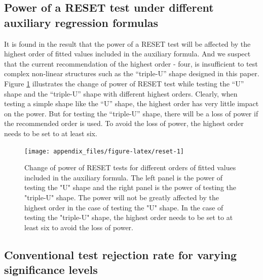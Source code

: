 \documentclass[]{interact}
\theoremstyle{plain}%
\theoremstyle{definition}
\theoremstyle{remark}
\begin{document}
\hypertarget{power-of-a-reset-test-under-different-auxiliary-regression-formulas}{%
\subsection{Power of a RESET test under different auxiliary regression
formulas}\label{power-of-a-reset-test-under-different-auxiliary-regression-formulas}}

It is found in the result that the power of a RESET test will be
affected by the highest order of fitted values included in the auxiliary
formula. And we suspect that the current recommendation of the highest
order - four, is insufficient to test complex non-linear structures such
as the ``triple-U'' shape designed in this paper. Figure \ref{fig:reset}
illustrates the change of power of RESET test while testing the ``U''
shape and the ``triple-U'' shape with different highest orders. Clearly,
when testing a simple shape like the ``U'' shape, the highest order has
very little impact on the power. But for testing the ``triple-U'' shape,
there will be a loss of power if the recommended order is used. To avoid
the loss of power, the highest order needs to be set to at least six.

\begin{figure}

{\centering \texttt{[image: appendix\_files/figure-latex/reset-1]} 

}

\caption{Change of power of RESET tests for different orders of fitted values included in the auxiliary formula. The left panel is the power of testing the "U" shape and the right panel is the power of testing the "triple-U" shape. The power will not be greatly affected by the highest order in the case of testing the "U" shape. In the case of testing the "triple-U" shape, the highest order needs to be set to at least six to avoid the loss of power.}\label{fig:reset}
\end{figure}

\hypertarget{conventional-test-rejection-rate-for-varying-significance-levels}{%
\subsection{Conventional test rejection rate for varying significance
levels}\label{conventional-test-rejection-rate-for-varying-significance-levels}}
\end{document}
